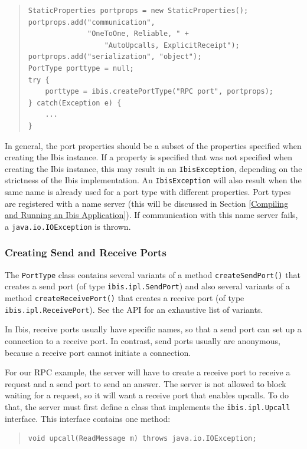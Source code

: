 \documentclass[10pt]{article}
\begin{document}
{\small
\begin{quote}
\begin{verbatim}
StaticProperties portprops = new StaticProperties();
portprops.add("communication",
              "OneToOne, Reliable, " + 
                  "AutoUpcalls, ExplicitReceipt");
portprops.add("serialization", "object");
PortType porttype = null;
try {
    porttype = ibis.createPortType("RPC port", portprops);
} catch(Exception e) {
    ...
}
\end{verbatim}
\end{quote}
}
\noindent
In general, the port properties should be a subset of the properties
specified when creating the Ibis instance. If a property is specified
that was not specified when creating the Ibis instance, this may
result in an \texttt{IbisException}, depending on the strictness of the
Ibis implementation.
An \texttt{IbisException} will also result when the same name is
already used for a port type with different properties.
Port types are registered with a name server
(this will be discussed in Section \ref{Compiling and Running an Ibis Application}).
If communication with this name server fails, a
\texttt{java.io.IOException} is thrown.

\subsubsection{Creating Send and Receive Ports}

The \texttt{PortType} class contains several variants of a method
\texttt{createSendPort()} that creates a send port (of type
\texttt{ibis.ipl.SendPort}) and
also several variants of a method \texttt{createReceivePort()} that
creates a receive port (of type \texttt{ibis.ipl.ReceivePort}).
See the API for an exhaustive list of variants.

In Ibis, receive ports usually have specific names, so that
a send port can set up a connection to a receive port. In contrast,
send ports usually are anonymous, because a receive port cannot
initiate a connection.

For our RPC example, the server will have to create a receive port
to receive a request and a send port to send an answer.
The server is not allowed to block waiting for a request, so it will
want a receive port that enables upcalls.
To do that, the server must first define a class that implements
the \texttt{ibis.ipl.Upcall} interface. This interface contains one
method:

{\small
\begin{quote}
\begin{verbatim}
void upcall(ReadMessage m) throws java.io.IOException;
\end{verbatim}
\end{quote}
}
\end{document}
